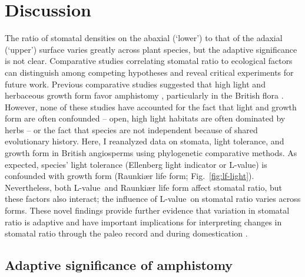 \documentclass[12pt, oneside]{article}
\newcommand{\el}{L-value}
\begin{document}


\section*{Discussion}

The ratio of stomatal densities on the abaxial (`lower') to that of the adaxial (`upper') surface varies greatly across plant species, but the adaptive significance is not clear. Comparative studies correlating stomatal ratio to ecological factors can distinguish among competing hypotheses and reveal critical experiments for future work. Previous comparative studies suggested that high light and herbaceous growth form favor amphistomy \citep{Mott_etal_1982, Jordan_etal_2014, Muir_2015, Bucher_etal_2017}, particularly in the British flora \citep{Salisbury_1927, Peat_Fitter_1994b}. However, none of these studies have accounted for the fact that light and growth form are often confounded -- open, high light habitats are often dominated by herbs -- or the fact that species are not independent because of shared evolutionary history. Here, I reanalyzed data on stomata, light tolerance, and growth form in British angiosperms using phylogenetic comparative methods. As expected, species' light tolerance (Ellenberg light indicator or \el) is confounded with growth form (Raunki\ae r life form; Fig.~\ref{fig:lf-light}). Nevertheless, both \el~and Raunki\ae r life form affect stomatal ratio, but these factors also interact; the influence of \el~on stomatal ratio varies across forms. These novel findings provide further evidence that variation in stomatal ratio is adaptive and have important implications for interpreting changes in stomatal ratio through the paleo record \citep{Jordan_etal_2014} and during domestication \citep{Milla_etal_2013}.

\subsection*{Adaptive significance of amphistomy}
\end{document}

